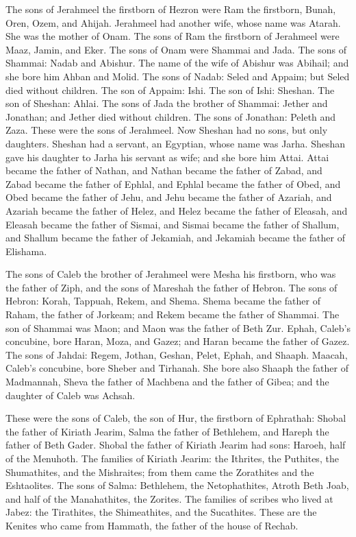  The sons of Jerahmeel the firstborn of Hezron were Ram the
firstborn, Bunah, Oren, Ozem, and Ahijah.  Jerahmeel had
another wife, whose name was Atarah. She was the mother of Onam.
 The sons of Ram the firstborn of Jerahmeel were Maaz,
Jamin, and Eker.  The sons of Onam were Shammai and Jada.
The sons of Shammai: Nadab and Abishur.  The name of the
wife of Abishur was Abihail; and she bore him Ahban and Molid.
 The sons of Nadab: Seled and Appaim; but Seled died
without children.  The son of Appaim: Ishi. The son of
Ishi: Sheshan. The son of Sheshan: Ahlai.  The sons of Jada
the brother of Shammai: Jether and Jonathan; and Jether died without
children.  The sons of Jonathan: Peleth and Zaza. These
were the sons of Jerahmeel.  Now Sheshan had no sons, but
only daughters. Sheshan had a servant, an Egyptian, whose name was
Jarha.  Sheshan gave his daughter to Jarha his servant as
wife; and she bore him Attai.  Attai became the father of
Nathan, and Nathan became the father of Zabad,  and Zabad
became the father of Ephlal, and Ephlal became the father of Obed,
 and Obed became the father of Jehu, and Jehu became the
father of Azariah,  and Azariah became the father of Helez,
and Helez became the father of Eleasah,  and Eleasah became
the father of Sismai, and Sismai became the father of Shallum,
 and Shallum became the father of Jekamiah, and Jekamiah
became the father of Elishama.

 The sons of Caleb the brother of Jerahmeel were Mesha his
firstborn, who was the father of Ziph, and the sons of Mareshah the
father of Hebron.  The sons of Hebron: Korah, Tappuah,
Rekem, and Shema.  Shema became the father of Raham, the
father of Jorkeam; and Rekem became the father of Shammai. 
The son of Shammai was Maon; and Maon was the father of Beth Zur.
 Ephah, Caleb's concubine, bore Haran, Moza, and Gazez; and
Haran became the father of Gazez.  The sons of Jahdai:
Regem, Jothan, Geshan, Pelet, Ephah, and Shaaph.  Maacah,
Caleb's concubine, bore Sheber and Tirhanah.  She bore also
Shaaph the father of Madmannah, Sheva the father of Machbena and the
father of Gibea; and the daughter of Caleb was Achsah.

 These were the sons of Caleb, the son of Hur, the
firstborn of Ephrathah: Shobal the father of Kiriath Jearim,
 Salma the father of Bethlehem, and Hareph the father of
Beth Gader.  Shobal the father of Kiriath Jearim had sons:
Haroeh, half of the Menuhoth.  The families of Kiriath
Jearim: the Ithrites, the Puthites, the Shumathites, and the Mishraites;
from them came the Zorathites and the Eshtaolites.  The
sons of Salma: Bethlehem, the Netophathites, Atroth Beth Joab, and half
of the Manahathites, the Zorites.  The families of scribes
who lived at Jabez: the Tirathites, the Shimeathites, and the
Sucathites. These are the Kenites who came from Hammath, the father of
the house of Rechab.

